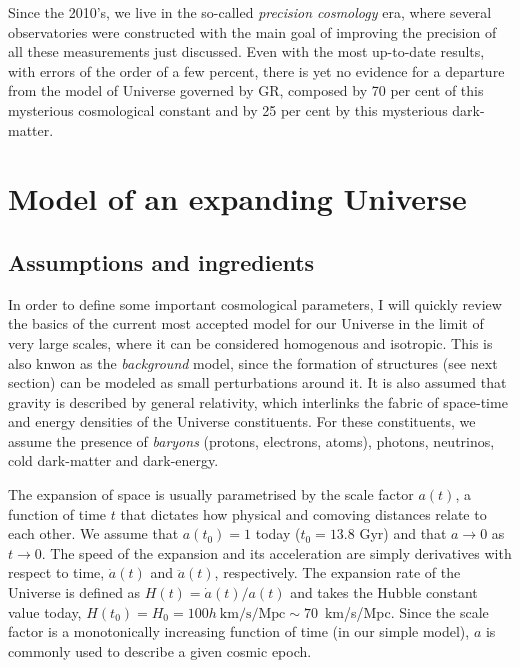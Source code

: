     Since the 2010's, we live in the so-called \emph{precision cosmology} era,
    where several observatories were constructed with the main goal of
    improving the precision of all these measurements just discussed. 
    Even with the most up-to-date results, with errors of the order of a few percent,
    there is yet no evidence for a departure from the model of Universe 
    governed by GR, composed by 70 per cent of this mysterious cosmological 
    constant and by 25 per cent by this mysterious dark-matter. 

\section{Model of an expanding Universe}
\label{sec:model_expanding_universe}

    \subsection{Assumptions and ingredients}

    In order to define some important cosmological parameters, I will quickly review
    the basics of the current most accepted model for our Universe in the limit of 
    very large scales, where it can be considered homogenous and isotropic. 
    This is also knwon as the \emph{background} model, since the formation of structures 
    (see next section) can
    be modeled as small perturbations around it. It is also assumed that gravity is 
    described by general relativity, which interlinks the fabric of space-time and 
    energy densities of the Universe constituents. For these constituents, we assume 
    the presence of \emph{baryons} (protons, electrons, atoms), 
    photons, neutrinos, cold dark-matter and dark-energy. 

    The expansion of space is usually parametrised by the scale factor $a(t)$, 
    a function of time $t$ that dictates how physical and comoving distances 
    relate to each other. We assume that $a(t_0) = 1$ today ($t_0 = 13.8$ Gyr) 
    and that $a \rightarrow 0$ as $t \rightarrow 0$. The speed of the expansion
    and its acceleration are simply derivatives with respect to time, $\dot{a}(t)$ 
    and $\ddot{a}(t)$, respectively. The expansion rate of the Universe is defined
    as $H(t) = \dot{a}(t)/a(t)$ and takes the Hubble constant value today, 
    $H(t_0) = H_0 = 100 h ~ \mathrm{km/s/Mpc} \sim 70$~km/s/Mpc. 
    Since the scale factor is a monotonically increasing function of time 
    (in our simple model), $a$ is commonly used to describe a given cosmic epoch. 

